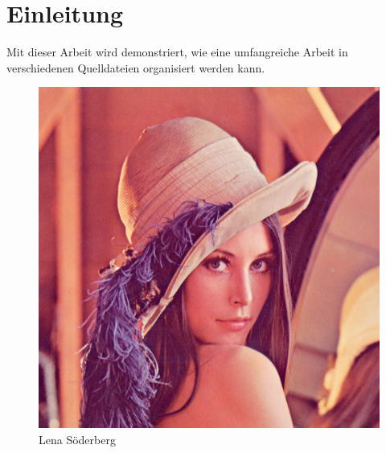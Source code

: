 \chapter{Einleitung}

Mit dieser Arbeit wird demonstriert, wie eine umfangreiche Arbeit in verschiedenen Quelldateien organisiert werden kann.

\begin{figure}[ht]
  \centering
  \includegraphics[width=.5\textwidth]{images/lenna}
  \caption{Lena Söderberg}
\end{figure}
